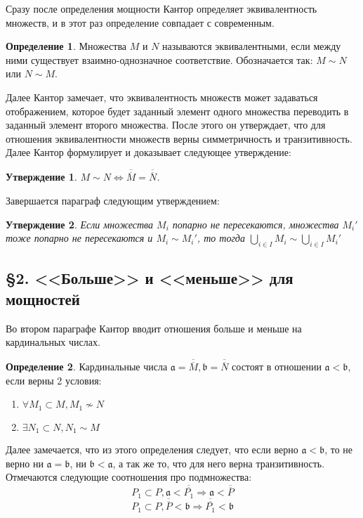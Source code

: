 \documentclass[a4paper,12pt]{extarticle}
\newtheorem{utv}{Утверждение}
\theoremstyle{definition}
\newtheorem{definition}{Определение}
\newcommand{\car}[1]{\overline{\overline{#1}}}
\begin{document}
Сразу после определения мощности Кантор определяет эквивалентность множеств, и в этот раз определение совпадает с современным.
\begin{definition}
Множества $M$ и $N$ называются эквивалентными, если между ними существует взаимно-однозначное соответствие. Обозначается так: $M \sim N$ или $N \sim M$.
\end{definition}

Далее Кантор замечает, что эквивалентность множеств может задаваться отображением, которое будет заданный элемент одного множества переводить в заданный элемент второго множества.
После этого он утверждает, что для отношения эквивалентности множеств верны симметричность и транзитивность.
Далее Кантор формулирует и доказывает следующее утверждение:
\begin{utv}
\label{simeq}
    $M \sim N \iff \car{M} = \car{N}$.
\end{utv}
Завершается параграф следующим утверждением:
\begin{utv}
\label{manysim}
Если множества $M_i$ попарно не пересекаются, множества $M_i'$ тоже попарно не пересекаются и $M_i \sim M_i'$, то тогда $\bigcup\limits_{i \in I} M_i \sim \bigcup\limits_{i \in I} M_i'$
\end{utv}

\subsection{\S 2. <<Больше>> и <<меньше>> для мощностей}
Во втором параграфе Кантор вводит отношения больше и меньше на кардинальных числах.

\begin{definition}
    \label{def-less}
    Кардинальные числа $\mathfrak{a} = \car{M}, \mathfrak{b} = \car{N}$ состоят в отношении $\mathfrak{a} < \mathfrak{b}$, если верны 2 условия:
    \begin{enumerate}
        \item $\forall M_1 \subset M, M_1 \nsim N$
        \item $\exists N_1 \subset N, N_1 \sim M$
    \end{enumerate}
\end{definition}
Далее замечается, что из этого определения следует, что если верно $\mathfrak{a} < \mathfrak{b}$, то не верно ни $\mathfrak{a} = \mathfrak{b}$, ни $\mathfrak{b} < \mathfrak{a}$,
а так же то, что для него верна транзитивность.
Отмечаются следующие соотношения про подмножества:
$$
P_1 \subset P, \mathfrak{a} < \car{P_1} \Rightarrow \mathfrak{a} < \car{P}
$$
$$
P_1 \subset P, \car{P} < \mathfrak{b} \Rightarrow \car{P_1} < \mathfrak{b}
$$
\end{document}
